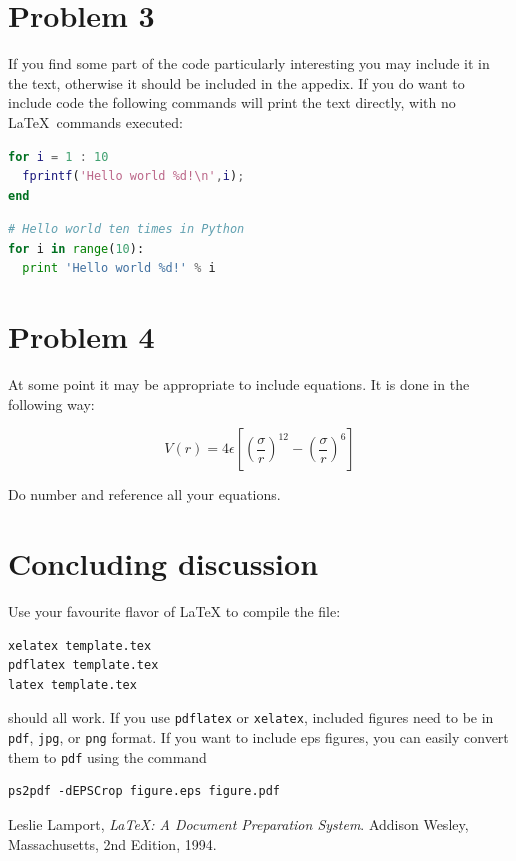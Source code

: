 \section*{Problem 3}

If you find some part of the code particularly interesting you may 
include it in the text, otherwise it should be included in the appedix.
If you do want to include code the following commands will print
the text directly, with no \LaTeX~commands executed:

\begin{lstlisting}[language=matlab]
% Hello world ten times in MATLAB
for i = 1 : 10
  fprintf('Hello world %d!\n',i);
end
\end{lstlisting}

\begin{lstlisting}[language=python]
# Hello world ten times in Python
for i in range(10):
  print 'Hello world %d!' % i
\end{lstlisting}

\section*{Problem 4}
At some point it may be appropriate to include equations. It is done in the
following way:

\begin{equation}
  V(r) = 4\epsilon \left[ \left( \frac{\sigma}{r} \right)^{12} - 
    \left(\frac{\sigma}{r} \right)^{6} \right]
\end{equation}

Do number and reference all your equations.

\section*{Concluding discussion}

Use your favourite flavor of \LaTeX{} to compile the file:
\begin{verbatim}
xelatex template.tex
pdflatex template.tex
latex template.tex
\end{verbatim}
should all work.
If you use \verb+pdflatex+ or \verb+xelatex+, included figures need to be in
\verb+pdf+, \verb+jpg+, or \verb+png+ format. If you want to include eps
figures, you can easily convert them to \verb+pdf+ using the command
\begin{verbatim}
ps2pdf -dEPSCrop figure.eps figure.pdf
\end{verbatim}

\begin{thebibliography}{69}
 Leslie Lamport, \emph{\LaTeX: A Document Preparation
System}. Addison Wesley, Massachusetts, 2nd Edition, 1994.
\end{thebibliography}

